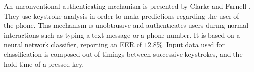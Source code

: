 An unconventional authenticating mechanism is presented by Clarke and Furnell \cite{clarke2007authenticating}. They use keystroke analysis in order to make predictions regarding the user of the phone. This mechanism is unobtrusive and authenticates users during normal interactions such as typing a text message or a phone number. It is based on a neural network classifier, reporting an EER of $12.8\%$. Input data used for classification is composed out of timings between successive keystrokes, and the hold time of a pressed key. 






